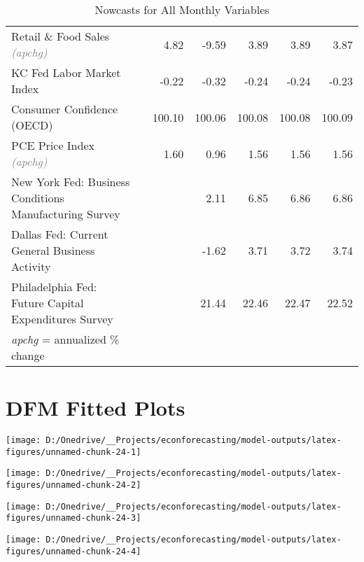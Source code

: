 \documentclass[11pt, letterpaper]{article}\usepackage[]{graphicx}\usepackage[]{color}
\begin{document}
\begin{table}[H]
\begin{tabular}{lrrrrrr}
  Retail \& Food Sales \textit{\footnotesize\textcolor{gray}{(apchg)}} &  & 4.82 & -9.59 & 3.89 & 3.89 & 3.87 \\ 
  KC Fed Labor Market Index &  & -0.22 & -0.32 & -0.24 & -0.24 & -0.23 \\ 
  Consumer Confidence (OECD) &  & 100.10 & 100.06 & 100.08 & 100.08 & 100.09 \\ 
  PCE Price Index \textit{\footnotesize\textcolor{gray}{(apchg)}} &  & 1.60 & 0.96 & 1.56 & 1.56 & 1.56 \\ 
  New York Fed: Business Conditions Manufacturing Survey &  &  & 2.11 & 6.85 & 6.86 & 6.86 \\ 
  Dallas Fed: Current General Business Activity &  &  & -1.62 & 3.71 & 3.72 & 3.74 \\ 
  Philadelphia Fed: Future Capital Expenditures Survey &  &  & 21.44 & 22.46 & 22.47 & 22.52 \\ 
   \hline 
 \textit{apchg} = annualized \% change 
\end{tabular}
\endgroup
\caption{Nowcasts for All Monthly Variables} 
\end{table}



\appendix
\appendixpage
\addappheadtotoc

\section{DFM Fitted Plots}


{\centering \texttt{[image: D:/Onedrive/\_\_Projects/econforecasting/model-outputs/latex-figures/unnamed-chunk-24-1]} 

}




{\centering \texttt{[image: D:/Onedrive/\_\_Projects/econforecasting/model-outputs/latex-figures/unnamed-chunk-24-2]} 

}




{\centering \texttt{[image: D:/Onedrive/\_\_Projects/econforecasting/model-outputs/latex-figures/unnamed-chunk-24-3]} 

}




{\centering \texttt{[image: D:/Onedrive/\_\_Projects/econforecasting/model-outputs/latex-figures/unnamed-chunk-24-4]} 

}
\end{document}
